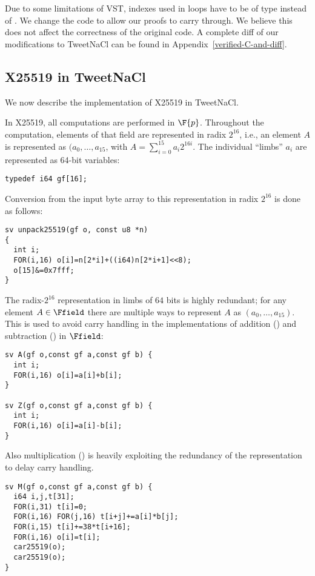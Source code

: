 Due to some limitations of VST, indexes used in  loops have to be
of type  instead of . We change the code to allow our
proofs to carry through. We believe this does not affect the correctness of the
original code. A complete diff of our modifications to TweetNaCl can be found in
Appendix~\ref{verified-C-and-diff}.





\subsection{X25519 in TweetNaCl}
\label{subsec:X25519-TweetNaCl}

We now describe the implementation of X25519 in TweetNaCl.

In X25519, all computations are performed in $\F{p}$.
Throughout the computation, elements of that field
are represented in radix $2^{16}$,
i.e., an element $A$ is represented as $(a_0,\dots,a_{15}$,
with $A = \sum_{i=0}^{15}a_i2^{16i}$.
The individual ``limbs'' $a_i$ are represented as
64-bit  variables:
\begin{lstlisting}[language=Ctweetnacl]
typedef i64 gf[16];
\end{lstlisting}

Conversion from the input byte array to this representation in radix $2^{16}$ is
done as follows:
\begin{lstlisting}[language=Ctweetnacl]
sv unpack25519(gf o, const u8 *n)
{
  int i;
  FOR(i,16) o[i]=n[2*i]+((i64)n[2*i+1]<<8);
  o[15]&=0x7fff;
}
\end{lstlisting}

The radix-$2^{16}$ representation in limbs of $64$ bits is
highly redundant; for any element $A \in \Ffield$ there are
multiple ways to represent $A$ as $(a_0,\dots,a_{15})$.
This is used to avoid carry handling in the implementations of addition
() and subtraction () in $\Ffield$:
\begin{lstlisting}[language=Ctweetnacl]
sv A(gf o,const gf a,const gf b) {
  int i;
  FOR(i,16) o[i]=a[i]+b[i];
}

sv Z(gf o,const gf a,const gf b) {
  int i;
  FOR(i,16) o[i]=a[i]-b[i];
}
\end{lstlisting}

Also multiplication () is heavily exploiting the redundancy
of the representation to delay carry handling.
\begin{lstlisting}[language=Ctweetnacl]
sv M(gf o,const gf a,const gf b) {
  i64 i,j,t[31];
  FOR(i,31) t[i]=0;
  FOR(i,16) FOR(j,16) t[i+j]+=a[i]*b[j];
  FOR(i,15) t[i]+=38*t[i+16];
  FOR(i,16) o[i]=t[i];
  car25519(o);
  car25519(o);
}
\end{lstlisting}

